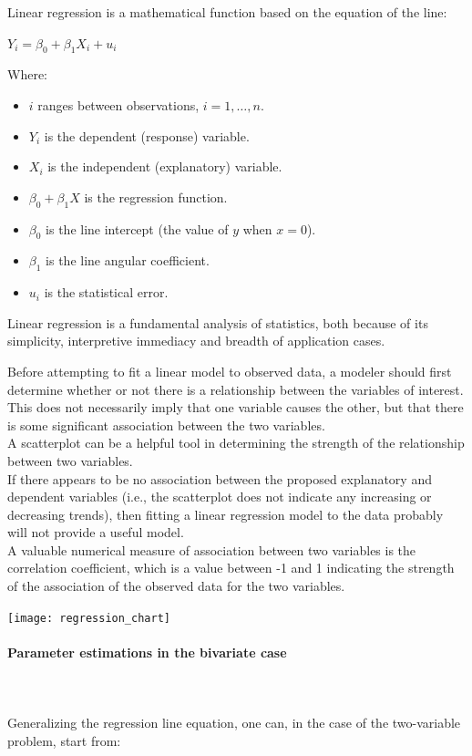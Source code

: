 \documentclass{article}
\begin{document}
Linear regression is a mathematical function based on the equation of the line:

$\displaystyle {Y_{i}=\beta _{0}+\beta _{1}X_{i}+u_{i}}$

Where:\\
\begin{itemize}
    \item $\displaystyle i$ ranges between observations, $\displaystyle i=1,\ldots,n.$
    \item $\displaystyle Y_{i}$ is the dependent (response) variable.
    \item $\displaystyle X_i$ is the independent (explanatory) variable.
    \item $\displaystyle \beta _{0}+\beta _{1}X$ is the regression function.
    \item $\displaystyle \beta _{0}$ is the line intercept (the value of $y$ when $x = 0$).
    \item $\displaystyle \beta _{1}$ is the line angular coefficient.
    \item $\displaystyle u_{i}$ is the statistical error.
\end{itemize}

Linear regression is a fundamental analysis of statistics, both because of its simplicity, interpretive immediacy and breadth of application cases.

Before attempting to fit a linear model to observed data, a modeler should first determine whether or not there is a relationship between the variables of interest. This does not necessarily imply that one variable causes the other, but that there is some significant association between the two variables. \\
A scatterplot can be a helpful tool in determining the strength of the relationship between two variables. \\
If there appears to be no association between the proposed explanatory and dependent variables (i.e., the scatterplot does not indicate any increasing or decreasing trends), then fitting a linear regression model to the data probably will not provide a useful model. \\ 
A valuable numerical measure of association between two variables is the correlation coefficient, which is a value between -1 and 1 indicating the strength of the association of the observed data for the two variables.

\texttt{[image: regression\_chart]}

\paragraph{Parameter estimations in the bivariate case}\mbox{} \\
\mbox{} \\
Generalizing the regression line equation, one can, in the case of the two-variable problem, start from:
\end{document}
